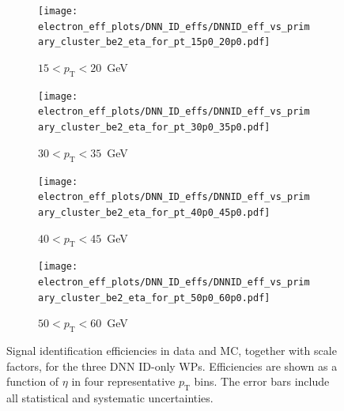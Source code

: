 \begin{figure}[htbp]
  \centering

  \begin{subfigure}[b]{0.48\textwidth}
    \centering
    \texttt{[image: electron\_eff\_plots/DNN\_ID\_effs/DNNID\_eff\_vs\_primary\_cluster\_be2\_eta\_for\_pt\_15p0\_20p0.pdf]}
    \caption{$15 < p_{\text{T}} < 20$~GeV}
    \label{fig:eff_sfs_dnn_ptbin1}
  \end{subfigure}
  \hfill
  \begin{subfigure}[b]{0.48\textwidth}
    \centering
    \texttt{[image: electron\_eff\_plots/DNN\_ID\_effs/DNNID\_eff\_vs\_primary\_cluster\_be2\_eta\_for\_pt\_30p0\_35p0.pdf]}
    \caption{$30 < p_{\text{T}} < 35$~GeV}
    \label{fig:eff_sfs_dnn_ptbin2}
  \end{subfigure}

  \vspace{0.5cm}

  \begin{subfigure}[b]{0.48\textwidth}
    \centering
    \texttt{[image: electron\_eff\_plots/DNN\_ID\_effs/DNNID\_eff\_vs\_primary\_cluster\_be2\_eta\_for\_pt\_40p0\_45p0.pdf]}
    \caption{$40 < p_{\text{T}} < 45$~GeV}
    \label{fig:eff_sfs_dnn_ptbin3}
  \end{subfigure}
  \hfill
  \begin{subfigure}[b]{0.48\textwidth}
    \centering
    \texttt{[image: electron\_eff\_plots/DNN\_ID\_effs/DNNID\_eff\_vs\_primary\_cluster\_be2\_eta\_for\_pt\_50p0\_60p0.pdf]}
    \caption{$50 < p_{\text{T}} < 60$~GeV}
    \label{fig:eff_sfs_dnn_ptbin4}
  \end{subfigure}

  \caption{
    Signal identification efficiencies in data and MC, together with scale factors, 
    for the three DNN ID-only WPs. 
    Efficiencies are shown as a function of $\eta$ in four representative $p_{\text{T}}$ bins. 
    The error bars include all statistical and systematic uncertainties.}
  \label{fig:eff_sfs_dnn_eta_4ptbins}
\end{figure}


